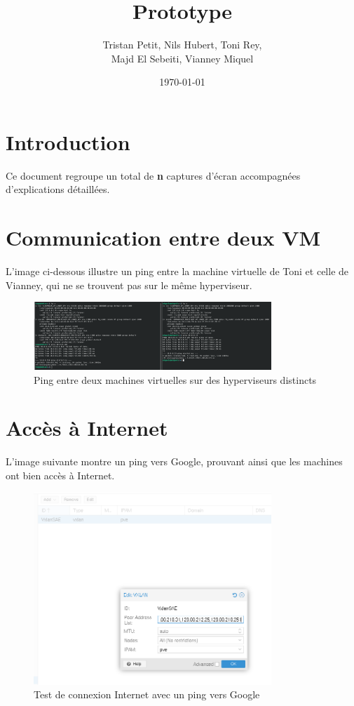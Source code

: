 \documentclass{article}
\begin{document}
\title{Prototype }
\author{Tristan Petit, Nils Hubert, Toni Rey, \\ Majd El Sebeiti, Vianney Miquel}
\date{\today}

\maketitle

\section{Introduction}

Ce document regroupe un total de \textbf{n} captures d'écran accompagnées d'explications détaillées.

\section{Communication entre deux VM}

L'image ci-dessous illustre un ping entre la machine virtuelle de Toni et celle de Vianney, qui ne se trouvent pas sur le même hyperviseur.

\begin{figure}[h]
    \centering
    \includegraphics[width=0.8\textwidth]{Ping.png}
    \caption{Ping entre deux machines virtuelles sur des hyperviseurs distincts}
\end{figure}

\section{Accès à Internet}

L'image suivante montre un ping vers Google, prouvant ainsi que les machines ont bien accès à Internet.

\begin{figure}[h]
    \centering
    \includegraphics[width=0.8\textwidth]{VxLan.png}
    \caption{Test de connexion Internet avec un ping vers Google}
\end{figure}
\end{document}
